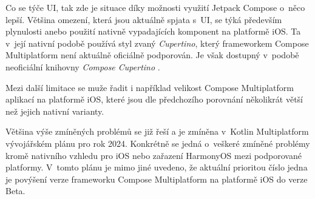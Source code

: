 Co se týče UI, tak zde je situace díky možnosti využití Jetpack Compose o~něco lepší. Většina omezení, která jsou
aktuálně spjata s~UI, se týká především plynulosti anebo použití nativně vypadajících komponent na platformě iOS.
Ta v~její nativní podobě používá styl zvaný \textit{Cupertino}, který frameworkem Compose Multiplatform 
není aktuálně oficiálně podporován. Je však dostupný v~podobě neoficiální knihovny \textit{Compose Cupertino} \cite{cupertinoCompoes}.

Mezi další limitace se muže řadit i například velikost Compose Multiplatform aplikací na platformě iOS, které jsou dle
předchozího porovnání několikrát větší než jejich nativní varianty.

\bigskip

Většina výše zmíněných problémů se již řeší a je zmíněna v~Kotlin Multiplatform vývojářském plánu pro rok 2024. \cite{KMPRoaddMap} Konkrétně
se jedná o~veškeré zmíněné problémy kromě nativního vzhledu pro iOS nebo zařazení HarmonyOS mezi podporované platformy. %
V~tomto plánu je mimo jiné uvedeno, že aktuální prioritou číslo jedna je povýšení verze frameworku Compose Multiplatform na platformě iOS do verze Beta. \cite{KMPRoaddMap}
